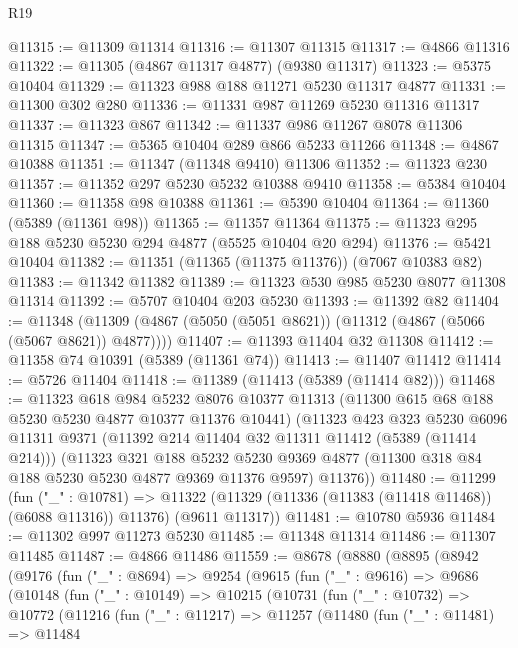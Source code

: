 \begin{lexlean}{R19}
\begin{coremodule}
@11315 := @11309 @11314
@11316 := @11307 @11315
@11317 := @4866 @11316
@11322 := @11305 (@4867 @11317 @4877) (@9380 @11317)
@11323 := @5375 @10404
@11329 := @11323 @988 @188 @11271 @5230 @11317 @4877
@11331 := @11300 @302 @280
@11336 := @11331 @987 @11269 @5230 @11316 @11317
@11337 := @11323 @867
@11342 := @11337 @986 @11267 @8078 @11306 @11315
@11347 := @5365 @10404 @289 @866 @5233 @11266
@11348 := @4867 @10388
@11351 := @11347 (@11348 @9410) @11306
@11352 := @11323 @230
@11357 := @11352 @297 @5230 @5232 @10388 @9410
@11358 := @5384 @10404
@11360 := @11358 @98 @10388
@11361 := @5390 @10404
@11364 := @11360 (@5389 (@11361 @98))
@11365 := @11357 @11364
@11375 := @11323 @295 @188 @5230 @5230 @294 @4877 (@5525 @10404 @20 @294)
@11376 := @5421 @10404
@11382 := @11351 (@11365 (@11375 @11376)) (@7067 @10383 @82)
@11383 := @11342 @11382
@11389 := @11323 @530 @985 @5230 @8077 @11308 @11314
@11392 := @5707 @10404 @203 @5230
@11393 := @11392 @82
@11404 := @11348 (@11309 (@4867 (@5050 (@5051 @8621)) (@11312 (@4867 (@5066 (@5067 @8621)) @4877))))
@11407 := @11393 @11404 @32 @11308
@11412 := @11358 @74 @10391 (@5389 (@11361 @74))
@11413 := @11407 @11412
@11414 := @5726 @11404
@11418 := @11389 (@11413 (@5389 (@11414 @82)))
@11468 := @11323
    @618
    @984
    @5232
    @8076
    @10377
    @11313
    (@11300 @615 @68 @188 @5230 @5230 @4877 @10377 @11376 @10441)
    (@11323
      @423
      @323
      @5230
      @6096
      @11311
      @9371
      (@11392 @214 @11404 @32 @11311 @11412 (@5389 (@11414 @214)))
      (@11323
        @321
        @188
        @5232
        @5230
        @9369
        @4877
        (@11300 @318 @84 @188 @5230 @5230 @4877 @9369 @11376 @9597)
        @11376))
@11480 := @11299
    (fun ("_" : @10781) =>
    @11322 (@11329 (@11336 (@11383 (@11418 @11468)) (@6088 @11316)) @11376) (@9611 @11317))
@11481 := @10780 @5936
@11484 := @11302 @997 @11273 @5230
@11485 := @11348 @11314
@11486 := @11307 @11485
@11487 := @4866 @11486
@11559 := @8678
    (@8880
      (@8895
        (@8942
          (@9176
            (fun ("_" : @8694) =>
            @9254
              (@9615
                (fun ("_" : @9616) =>
                @9686
                  (@10148
                    (fun ("_" : @10149) =>
                    @10215
                      (@10731
                        (fun ("_" : @10732) =>
                        @10772
                          (@11216
                            (fun ("_" : @11217) =>
                            @11257
                              (@11480
                                (fun ("_" : @11481) =>
                                @11484

\end{coremodule}
\end{lexlean}
